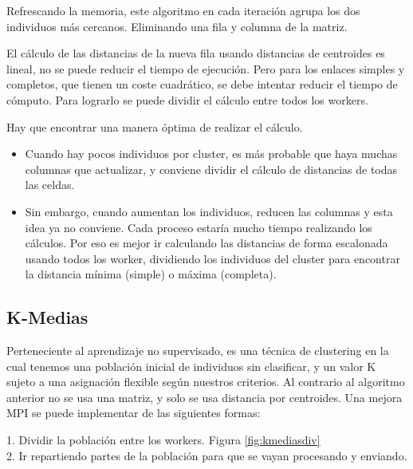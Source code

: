 		Refrescando la memoria, este algoritmo en cada iteración agrupa los dos individuos más cercanos. Eliminando una fila y columna de la matriz.
		
		\newpage
		
			
	
			
			
			
			
		
		El cálculo de las distancias de la nueva fila usando distancias de centroides es lineal, no se puede reducir el tiempo de ejecución. Pero para los enlaces simples y completos, que tienen un coste cuadrático, se debe intentar reducir el tiempo de cómputo. Para lograrlo se puede dividir el cálculo entre todos los workers. 
		
		Hay que encontrar una manera óptima de realizar el cálculo. 
		\begin{itemize}
			\item Cuando hay pocos individuos por cluster, es más probable que haya muchas columnas que actualizar, y conviene dividir el cálculo de distancias de todas las celdas. 
			\item Sin embargo, cuando aumentan los individuos, reducen las columnas y esta idea ya no conviene. Cada proceso estaría mucho tiempo realizando los cálculos. Por eso es mejor ir calculando las distancias de forma escalonada usando todos los worker, dividiendo los individuos del cluster para encontrar la distancia mínima (simple) o máxima (completa).
		\end{itemize}
		
		
		
		
	\subsection{K-Medias}
		Perteneciente al aprendizaje no supervisado, es una técnica de clustering en la cual tenemos una población inicial de individuos sin clasificar, y un valor K sujeto a una asignación flexible según nuestros criterios. Al contrario al algoritmo anterior no se usa una matriz, y solo se usa distancia por centroides. Una mejora MPI se puede implementar de las siguientes formas:
		
		\begin{flushleft}
			1. Dividir la población entre los workers. Figura \ref{fig:kmediasdiv} \\
			2. Ir repartiendo partes de la población para que se vayan procesando y enviando.\\
		\end{flushleft}
		

